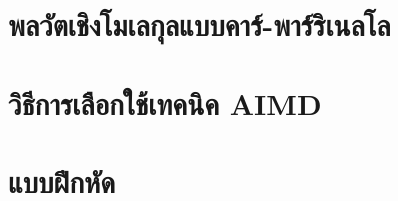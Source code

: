 \section{พลวัตเชิงโมเลกุลแบบคาร์-พาร์ริเนลโล}

\section{วิธีการเลือกใช้เทคนิค AIMD}

\section{แบบฝึกหัด}
